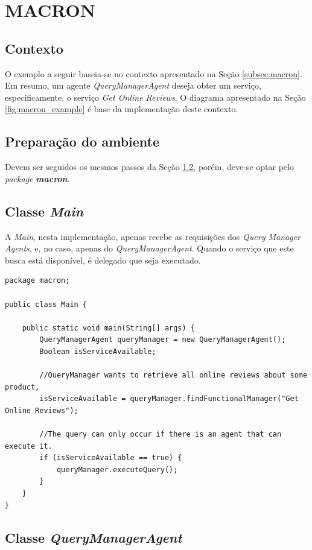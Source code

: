 
\section{MACRON}\label{appendix:macron}
\subsection{Contexto}

O exemplo a seguir baseia-se no contexto apresentado na Seção \ref{subsec:macron}. Em resumo, um agente \textit{QueryManagerAgent} deseja obter um serviço, especificamente, o serviço \textit{Get Online Reviews}. O diagrama apresentado na Seção \ref{fig:macron_example} é base da implementação deste contexto.

\subsection{Preparação do ambiente}\label{subsec:preparacao_ambiente_eclipse}

Devem ser seguidos os mesmos passos da Seção \ref{subsec:preparacao_ambiente_eclipse}, porém, deve-se optar pelo \textit{package} \textit{\textbf{macron}}.

\subsection{Classe \textit{Main}}

A \textit{Main}, nesta implementação, apenas recebe as requisições dos \textit{Query Manager Agents}, e, no caso, apenas do \textit{QueryManagerAgent}. Quando o serviço que este busca está disponível, é delegado que seja executado.

\begin{lstlisting}
package macron;

public class Main {

	public static void main(String[] args) {	
		QueryManagerAgent queryManager = new QueryManagerAgent();
		Boolean isServiceAvailable;
		
		//QueryManager wants to retrieve all online reviews about some product,
		isServiceAvailable = queryManager.findFunctionalManager("Get Online Reviews");
		
		//The query can only occur if there is an agent that can execute it.
		if (isServiceAvailable == true) {
			queryManager.executeQuery();
		} 
	}
}
\end{lstlisting}

\subsection{Classe \textit{QueryManagerAgent}}


